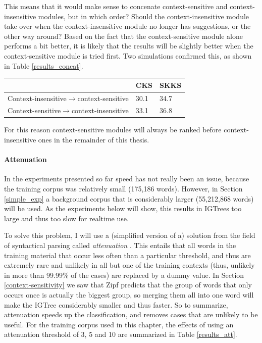 \documentclass[11pt]{article}
\let\originaltable\table
\let\endoriginaltable\endtable
\renewenvironment{table}[1][ht]{%
  \originaltable[#1]
  \centering}%
  {\endoriginaltable}
\begin{document}
This means that it would make sense to concenate context-sensitive and context-insensitive modules, but in which order? Should the context-insensitive module take over when the context-insensitive module no longer has suggestions, or the other way around? Based on the fact that the context-sensitive module alone performs a bit better, it is likely that the results will be slightly better when the context-sensitive module is tried first. Two simulations confirmed this, as shown in Table \ref{results_concat}.

\begin{table}[h]
\begin{tabular}{l|ll} 
&CKS&SKKS\\
\hline
Context-insensitive$\rightarrow$context-sensitive&30.1&34.7\\
Context-sensitive$\rightarrow$context-insensitive&33.1&36.8\\
\end{tabular} 
\caption{Percentage of keystrokes Xxx saves with a context-sensitive module first and a context-insensitive module first} \label{results_concat}
\end{table}

For this reason context-sensitive modules will always be ranked before context-insensitive ones in the remainder of this thesis.

\paragraph{Attenuation}

In the experiments presented so far speed has not really been an issue, because the training corpus was relatively small (175,186 words). However, in Section \ref{simple_exp} a background corpus that is considerably larger (55,212,868 words) will be used. As the experiments below will show, this results in IGTrees too large and thus too slow for realtime use.

To solve this problem, I will use a (simplified version of a) solution from the field of syntactical parsing called \emph{attenuation} \cite{eisner96}. This entails that all words in the training material that occur less often than a particular threshold, and thus are extremely rare and unlikely in all but one of the training contexts (thus, unlikely in more than 99.99\% of the cases) are replaced by a dummy value. In Section \ref{context-sensitivity} we saw that Zipf predicts that the group of words that only occurs once is actually the biggest group, so merging them all into one word will make the IGTree considerably smaller and thus faster. So to summarize, attenuation speeds up the classification, and removes cases that are unlikely to be useful. For the training corpus used in this chapter, the effects of using an attenuation threshold of 3, 5 and 10 are summarized in Table \ref{results_att}.
\end{document}
